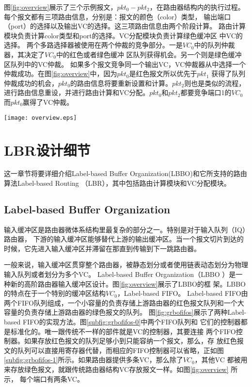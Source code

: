 图\ref{fig:overview}展示了三个示例报文，$pkt_0-pkt_2$，在路由器结构内的执行过程。每个报文都有三项路由信息，分别是：报文的颜色（color）类型，
输出端口（port）的选择以及输出VC的选择。这三项路由信息由两个阶段计算。
路由计算模块负责计算color类型和port的选择。VC分配模块负责计算绿色缓冲区
中VC的选择。
两个多路选择器被使用在两个仲裁的竞争部分。一是$VC_0$中的队列仲裁器，其决定了$VC_0$中的红色或者绿色缓冲
区队列获得机会。另一个则是绿色缓冲区队列中的VC仲裁。
如果多个报文竞争同一个输出VC，VC仲裁器从中选择一个仲裁成功。在图\ref{fig:overview}中，因为$pkt_0$是红色报文所以优先于$pkt_1$ 获得了队列仲裁成功的机会，$pkt_0$的路由信息将要重新设置和计算。$pkt_2$则也是类似的流程，进行路由信息重设，并进行路由计算和VC分配。$pkt_0$和$pkt_2$都要竞争端口1的$VC_0$而$pkt_0$赢得了VC仲裁。


\begin{figure*}[t]
  \centering
  \texttt{[image: overview.eps]}
  \caption{LBBO结构和LBR的工作流程}
  \label{fig:overview}
\end{figure*}

\section{LBR设计细节}

这一章节将要详细介绍Label-based Buffer Organization(LBBO)和它所支持的路由算法Label-based Routing （LBR），其中包括路由计算模块和VC分配模块。

\subsection{Label-based Buffer Organization}

输入缓冲区是路由器微体系结构里最复杂的部分之一。特别是对于输入队列（IQ）路由器，
下游的输入缓冲区能够替代上游的输出缓冲区。当一个报文切片到达的
时候，它先进入输入缓冲区并滞留在那直到传输到下一跳路由器。

一般来说，输入缓冲区贯穿整个路由器，被静态划分或者使用链表动态划分为物理输入队列或者划分为多个VC。
Label-based Buffer Organization（LBBO
）是一种新的高阶路由器输入缓冲区设计。图\ref{fig:overview}展示了LBBO的框
架。LBBO的特点在于一个特别的缓冲区结构$VC_0$，Label-based FIFO。 Label-based
FIFO由两个FIFO队列组成，一个小容量的负责存储上游路由器的红色报文队列和一个大容量的负责存储上游路由器的绿色报文的队列。
图\ref{fig:grbofifos}展示了两种Label-based FIFO的实现方法。图\ref{subfig:grbofifos-0}中两个FIFO队列和
它们的控制器都是标准化的。唯一跟传统不一样的部件就是VC的控制器，其要连接
两个FIFO控制器。如果存放红色报文的队列足够小到只能容纳一个报文，那么，存
放红色报文的队列可以直接用寄存器代替，而相应的FIFO控制器可以省略，正如图
\ref{subfig:grbofifos-1}所示。如果路由器提供多条VC，那么除了$VC_0$，其他VC
都被用来存放绿色报文，就跟传统路由器结构VC存放报文一样。如图\ref{fig:overview} 所示，
每个端口有两条VC。

